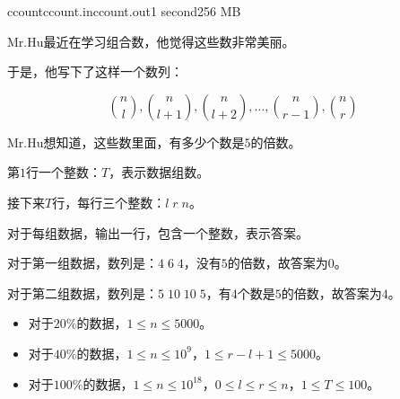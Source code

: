 \documentclass[11pt,a4paper,oneside]{article}
\begin{document}
\begin{problem}{ccount}{ccount.in}{ccount.out}{1 second}{256 MB}	
	
	Mr.Hu最近在学习组合数，他觉得这些数非常美丽。
	
	于是，他写下了这样一个数列：
	
	$$
		\binom{n}{l}, \binom{n}{l+1}, \binom{n}{l+2}, \dots, \binom{n}{r-1}, \binom{n}{r}
	$$
	
	Mr.Hu想知道，这些数里面，有多少个数是$5$的倍数。
	
	\InputFile
	
	第$1$行一个整数：$T$，表示数据组数。
	
	接下来$T$行，每行三个整数：$l \; r \; n$。
	
	\OutputFile
	
	对于每组数据，输出一行，包含一个整数，表示答案。
	
	\Example
	
	\begin{example}
	\end{example}
	
	对于第一组数据，数列是：$4 \; 6 \; 4$，没有$5$的倍数，故答案为$0$。
	
	对于第二组数据，数列是：$5 \; 10 \; 10 \; 5$，有$4$个数是$5$的倍数，故答案为$4$。
	
	\Note
	
	\begin{itemize}
		\item 对于$20\%$的数据，$1 \leq n \leq 5000$。
		\item 对于$40\%$的数据，$1 \leq n \leq 10^9$，$1 \leq r - l + 1 \leq 5000$。
		\item 对于$100\%$的数据，$1 \leq n \leq 10^{18}$，$0 \leq l \leq r \leq n$，$1 \leq T \leq 100$。
	\end{itemize}

\end{problem}
\end{document}

